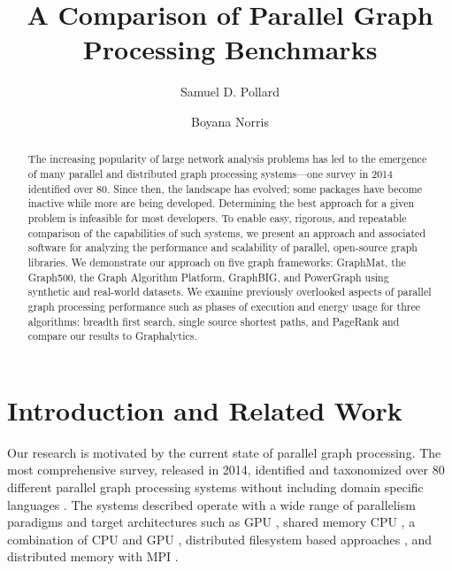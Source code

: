 \documentclass{llncs}
\begin{document}
\title{A Comparison of Parallel Graph Processing Benchmarks}
\author{Samuel D. Pollard \and Boyana Norris}
\maketitle
\begin{abstract}
The increasing popularity of large network analysis problems has led to the emergence of many parallel and distributed graph processing systems---one survey in 2014 identified over 80. Since then, the landscape has evolved; some packages have become inactive while more are being developed. Determining the best approach for a given problem is infeasible for most developers. To enable easy, rigorous, and repeatable comparison of the capabilities of such systems, we present an approach and associated software for analyzing the performance and scalability of parallel, open-source graph libraries. We demonstrate our approach on five graph frameworks: GraphMat, the Graph500, the Graph Algorithm Platform, GraphBIG, and PowerGraph using synthetic and real-world datasets. We examine previously overlooked aspects of parallel graph processing performance such as phases of execution and energy usage for three algorithms: breadth first search, single source shortest paths, and PageRank and compare our results to Graphalytics.
\end{abstract}

\section{Introduction and Related Work}

Our research is motivated by the current state of parallel graph processing. The most comprehensive survey, released in 2014, identified and taxonomized over 80 different parallel graph processing systems without including domain specific languages \cite{Doekemeijer:2015:GPFSurvey}. The systems described operate with a wide range of parallelism paradigms and target architectures such as GPU \cite{Zhong:2014:Medusa, Kang:2009:Pegasus}, shared memory CPU \cite{Shun:2013:Ligra, kyrola:2012:Graphchi, Nguyen:2013:Galois}, a combination of CPU and GPU \cite{Gharaibeh:2012:Totem}, distributed filesystem based approaches \cite{Xin:2013:GraphX}, and distributed memory with MPI \cite{Gregor:2005:PBGL}.
\end{document}
